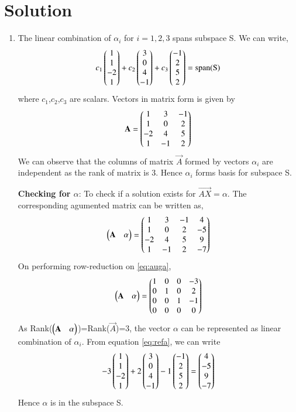 \documentclass[journal,12pt,twocolumn]{IEEEtran}
\begin{document}
\section{Solution}
\begin{enumerate}
\item The linear combination of $\alpha_i$ for $i=1,2,3$ spans subspace S. We can write,
\begin{align}
c_1\begin{pmatrix}1\\1\\-2\\1\end{pmatrix}+c_2\begin{pmatrix}3\\0\\4\\-1\end{pmatrix}+c_3\begin{pmatrix}-1\\2\\5\\2\end{pmatrix}=\text{span(S)}
\end{align}
where $c_1$,$c_2$,$c_3$ are scalars.
Vectors in matrix form is given by
\begin{align}
\mathbf{A}=\begin{pmatrix}1&3&-1\\1&0&2\\-2&4&5\\1&-1&2\end{pmatrix}
\end{align}
We can observe that the columns of matrix $\vec{A}$ formed by vectors $\alpha_i$ are independent as the rank of matrix is 3. Hence $\alpha_i$ forms basis for subspace S.

\textbf{Checking for $\alpha$}:
To check if a solution exists for $\vec{AX}=\alpha$. The corresponding agumented matrix can be written as,
\begin{align} \label{eq:auga}
\begin{pmatrix}\mathbf{A}&\alpha\end{pmatrix}=\begin{pmatrix}1&3&-1&4\\1&0&2&-5\\-2&4&5&9\\1&-1&2&-7\end{pmatrix}
\end{align}
On performing row-reduction on \eqref{eq:auga}, 
\begin{align}\label{eq:refa}
\begin{pmatrix}\mathbf{A}&\alpha\end{pmatrix}=\begin{pmatrix}1&0&0&-3\\0&1&0&2\\0&0&1&-1\\0&0&0&0\end{pmatrix}
\end{align}
As Rank($\begin{pmatrix}\mathbf{A}&\alpha\end{pmatrix}$)=Rank($\vec{A}$)=3, the vector $\alpha$ can be represented as linear combination of $\alpha_i$. From equation \eqref{eq:refa}, we can write
\begin{align}
-3\begin{pmatrix}1\\1\\-2\\1\end{pmatrix}+2\begin{pmatrix}3\\0\\4\\-1\end{pmatrix}-1\begin{pmatrix}-1\\2\\5\\2\end{pmatrix}=\begin{pmatrix}4\\-5\\9\\-7\end{pmatrix}
\end{align}
Hence $\alpha$ is in the subspace S.


\end{enumerate}
\end{document}
